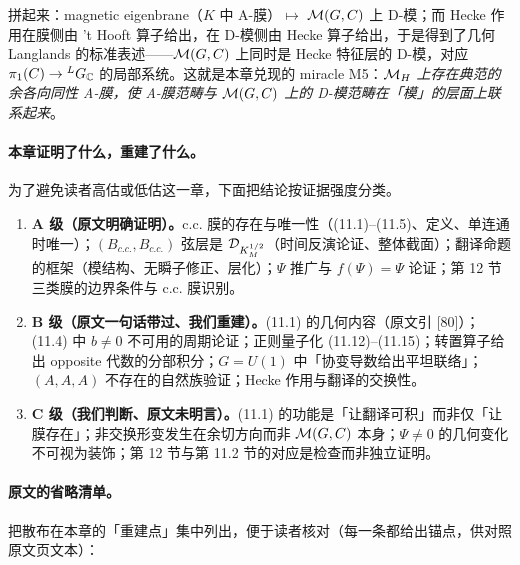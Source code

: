 拼起来：magnetic eigenbrane（\(K\) 中 A-膜）\(\mapsto\) \(\mathcal{M}(G,C)\) 上 D-模；而 Hecke 作用在膜侧由 't Hooft 算子给出，在 D-模侧由 Hecke 算子给出，于是得到了几何 Langlands 的标准表述——\(\mathcal{M}(G,C)\) 上同时是 Hecke 特征层的 D-模，对应 \(\pi_1(C)\to{}^{L}G_{\mathbb{C}}\) 的局部系统。这就是本章兑现的 miracle M5：\emph{\(\mathcal{M}_H\) 上存在典范的余各向同性 A-膜，使 A-膜范畴与 \(\mathcal{M}(G,C)\) 上的 D-模范畴在「模」的层面上联系起来}。

\paragraph{本章证明了什么，重建了什么。}为了避免读者高估或低估这一章，下面把结论按证据强度分类。

\begin{enumerate}
\item \textbf{A 级（原文明确证明）。}c.c. 膜的存在与唯一性（(11.1)--(11.5)、定义、单连通时唯一）；\((B_{c.c.},B_{c.c.})\) 弦层是 \(\mathcal{D}_{K_M^{1/2}}\)（时间反演论证、整体截面）；翻译命题的框架（模结构、无瞬子修正、层化）；\(\Psi\) 推广与 \(f(\Psi)=\Psi\) 论证；第 12 节三类膜的边界条件与 c.c. 膜识别。\pA{}\pA{}\pA{}
\item \textbf{B 级（原文一句话带过、我们重建）。}(11.1) 的几何内容（原文引 [80]）；(11.4) 中 \(b\neq0\) 不可用的周期论证；正则量子化 (11.12)--(11.15)；转置算子给出 opposite 代数的分部积分；\(G=U(1)\) 中「协变导数给出平坦联络」；\((A,A,A)\) 不存在的自然族验证；Hecke 作用与翻译的交换性。\pB{}\pB{}\pB{}
\item \textbf{C 级（我们判断、原文未明言）。}(11.1) 的功能是「让翻译可积」而非仅「让膜存在」；非交换形变发生在余切方向而非 \(\mathcal{M}(G,C)\) 本身；\(\Psi\neq0\) 的几何变化不可视为装饰；第 12 节与第 11.2 节的对应是检查而非独立证明。\pC{}\pC{}
\end{enumerate}

\paragraph{原文的省略清单。}把散布在本章的「重建点」集中列出，便于读者核对（每一条都给出锚点，供对照原文页文本）：

